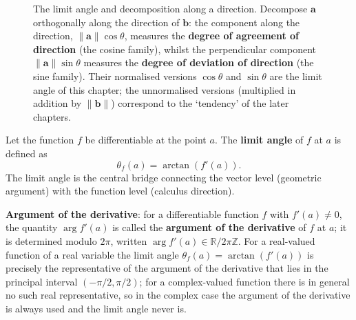 \begin{figure}[htbp]
\centering
{}
\caption{The limit angle and decomposition along a direction. Decompose $\mathbf a$ orthogonally along the direction of $\mathbf b$: the component along the direction, $\|\mathbf a\|\cos\theta$, measures the \textbf{degree of agreement of direction} (the cosine family), whilst the perpendicular component $\|\mathbf a\|\sin\theta$ measures the \textbf{degree of deviation of direction} (the sine family). Their normalised versions $\cos\theta$ and $\sin\theta$ are the limit angle of this chapter; the unnormalised versions (multiplied in addition by $\|\mathbf b\|$) correspond to the `tendency' of the later chapters.}
\label{fig:limit_angle_decomposition}
\end{figure}

\begin{definition}\label{def:limit_angle}
Let the function $f$ be differentiable at the point $a$. The \textbf{limit angle} of $f$ at $a$ is defined as
\[\theta_f(a) = \arctan(f'(a)).\]
The limit angle is the central bridge connecting the vector level (geometric argument) with the function level (calculus direction).

\textbf{Argument of the derivative}: for a differentiable function $f$ with $f'(a) \neq 0$, the quantity $\arg f'(a)$ is called the \textbf{argument of the derivative} of $f$ at $a$; it is determined modulo $2\pi$, written $\arg f'(a) \in \mathbb{R}/2\pi\mathbb{Z}$. For a real-valued function of a real variable the limit angle $\theta_f(a) = \arctan(f'(a))$ is precisely the representative of the argument of the derivative that lies in the principal interval $(-\pi/2, \pi/2)$; for a complex-valued function there is in general no such real representative, so in the complex case the argument of the derivative is always used and the limit angle never is.
\end{definition}


